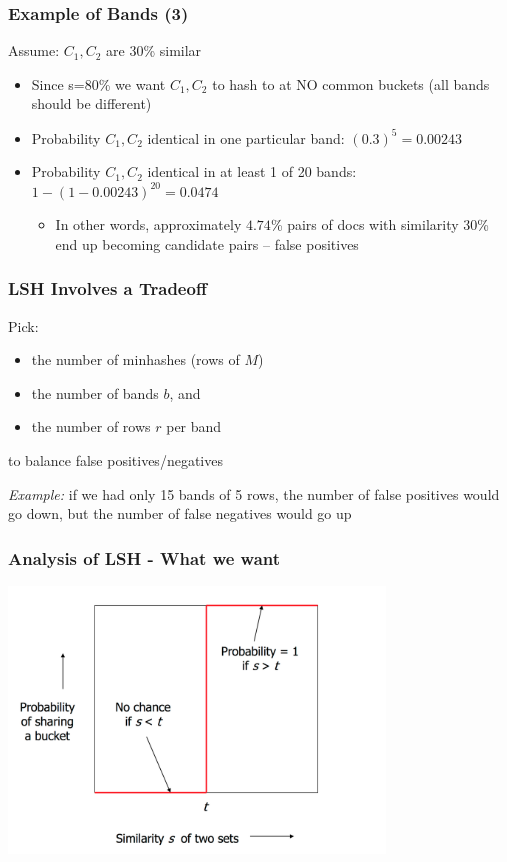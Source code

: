 \documentclass[svgnames]{beamer}
\begin{document}
  
\begin{frame} \frametitle{Example of Bands (3)}

\begin{block}{Assume: $C_1, C_2$ are 30\% similar}
\begin{itemize}
\item Since s=80\% we want $C_1, C_2$ to hash to at NO common buckets (all bands should be different)
\item Probability $C_1, C_2$ identical in one particular band: $(0.3)^5 = 0.00243$
\item Probability $C_1, C_2$ identical in at least 1 of 20 bands: $1 - (1 - 0.00243)^{20} = 0.0474$
  \begin{itemize}
  \item In other words, approximately $4.74$\% pairs of docs with similarity 30\% end up becoming candidate pairs -- false positives
  \end{itemize}
\end{itemize}
\end{block}
\end{frame}

  
\begin{frame} \frametitle{LSH Involves a Tradeoff}
\begin{block}{}
Pick:
\begin{itemize}
  \item the number of minhashes (rows of $M$)
  \item the number of bands $b$, and
  \item the number of rows $r$ per band
\end{itemize}
to balance false positives/negatives
\end{block}

\emph{Example:} if we had only 15 bands of 5 rows, the number of false positives would go down, but the number of false negatives would go up
\end{frame}

  
\begin{frame} \frametitle{Analysis of LSH - What we want}
\includegraphics[width=10cm]{what-we-want}
\end{frame}
\end{document}
